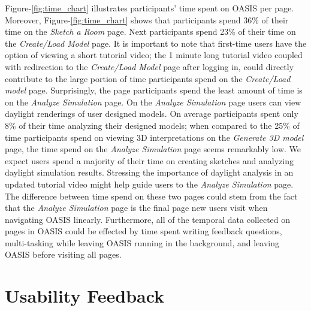 Figure-\ref{fig:time_chart} illustrates participants' time spent on OASIS per page.  Moreover, Figure-\ref{fig:time_chart} shows that participants spend 36\% of their time on the \textit{ Sketch a Room} page.  Next participants spend 23\% of their time on the \textit{Create/Load Model} page.  It is important to note that first-time users have the option of viewing a short tutorial video; the 1 minute long tutorial video coupled with redirection to the \textit{Create/Load Model} page after logging in, could directly contribute to the large portion of time participants spend on the \textit{Create/Load model} page.  Surprisingly, the page participants spend the least amount of time is on the \textit{Analyze Simulation} page.  On the \textit{Analyze Simulation} page users can view daylight renderings of user designed models.  On average participants spent only 8\% of their time analyzing their designed models; when compared to the 25\% of time participants spend on viewing 3D interpretations on the \textit{Generate 3D model} page, the time spend on the \textit{Analyze Simulation} page seems remarkably low.  We expect users spend a majority of their time on creating sketches and analyzing daylight simulation results.  Stressing the importance of daylight analysis in an updated tutorial video might help guide users to the \textit{Analyze Simulation} page.  The difference between time spend on these two pages could stem from the fact that the \textit{Analyze Simulation} page is the final page new users visit when navigating OASIS linearly.  Furthermore, all of the temporal data collected on pages in OASIS could be effected by time spent writing feedback questions, multi-tasking while leaving OASIS running in the background, and leaving OASIS before visiting all pages.  \\
 
\section{Usability Feedback}


